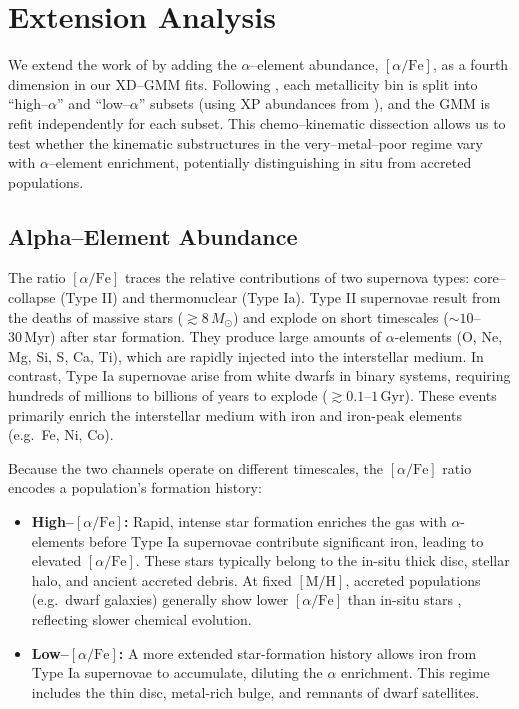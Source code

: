 \documentclass[a4paper,12pt]{article}
\begin{document}
\section{Extension Analysis}

We extend the work of \citet{zhang2024existencemetalpoordiscmilky} by adding the $\alpha$–element abundance, $[\alpha/\mathrm{Fe}]$, as a fourth dimension in our XD–GMM fits.  Following \citet{Vis2024}, each metallicity bin is split into “high–$\alpha$” and “low–$\alpha$” subsets (using XP abundances from \citealt{Li2024}), and the GMM is refit independently for each subset.  This chemo–kinematic dissection allows us to test whether the kinematic substructures in the very–metal–poor regime vary with $\alpha$–element enrichment, potentially distinguishing in situ from accreted populations.

\subsection{Alpha–Element Abundance}
\label{subsec:alpha}

The ratio $[\alpha/\mathrm{Fe}]$ traces the relative contributions of two supernova types: 
core–collapse (Type II) and thermonuclear (Type Ia). Type II supernovae result from the deaths of massive 
stars ($\gtrsim8\,M_\odot$) and explode on short timescales ($\sim10$–$30\,\mathrm{Myr}$) after star 
formation. They produce large amounts of $\alpha$-elements (O, Ne, Mg, Si, S, Ca, Ti), which are rapidly 
injected into the interstellar medium. In contrast, Type Ia supernovae arise from white dwarfs in binary 
systems, requiring hundreds of millions to billions of years to explode ($\gtrsim0.1$–$1\,\mathrm{Gyr}$). 
These events primarily enrich the interstellar medium with iron and iron-peak elements (e.g.\ Fe, Ni, Co).

Because the two channels operate on different timescales, the $[\alpha/\mathrm{Fe}]$ ratio encodes a 
population’s formation history:

\begin{itemize}
  \item \textbf{High–$[\alpha/\mathrm{Fe}]$:}  
    Rapid, intense star formation enriches the gas with $\alpha$-elements before Type Ia supernovae 
    contribute significant iron, leading to elevated $[\alpha/\mathrm{Fe}]$. These stars typically belong 
    to the in-situ thick disc, stellar halo, and ancient accreted debris. At fixed $[\mathrm{M/H}]$, 
    accreted populations (e.g.\ dwarf galaxies) generally show lower $[\alpha/\mathrm{Fe}]$ than in-situ 
    stars \citep{Helmi2018}, reflecting slower chemical evolution.
    
  \item \textbf{Low–$[\alpha/\mathrm{Fe}]$:}  
    A more extended star-formation history allows iron from Type Ia supernovae to accumulate, diluting 
    the $\alpha$ enrichment. This regime includes the thin disc, metal-rich bulge, and remnants of dwarf 
    satellites.
\end{itemize}
\end{document}
